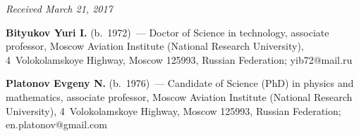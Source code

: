 \vspace*{-6pt}

\hfill{\small\textit{Received March 21, 2017}}


\Contr

\noindent
\textbf{Bityukov Yuri I.} (b.\ 1972)~--- 
Doctor of Science in technology, associate professor, 
Moscow Aviation Institute (National Research University), 
4~Volokolamskoye Highway, Moscow 125993, Russian Federation; 
\mbox{yib72@mail.ru}

\vspace*{3pt}

\noindent
\textbf{Platonov Evgeny N.} (b.\ 1976)~--- Candidate of Science (PhD) in physics 
and mathematics, associate professor, Moscow Aviation Institute (National 
Research University), 4~Volokolamskoye Highway, Moscow 125993, Russian Federation;
\mbox{en.platonov@gmail.com}
\label{end\stat}


\renewcommand{\bibname}{\protect\rm Литература} 